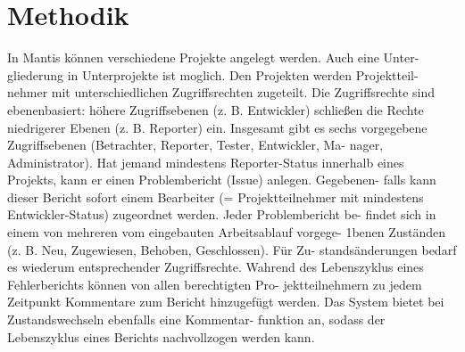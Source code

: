 \section{Methodik}
In Mantis können verschiedene Projekte angelegt werden. Auch eine Unter-
gliederung in Unterprojekte ist moglich. Den Projekten werden Projektteil-
nehmer mit unterschiedlichen Zugriffsrechten zugeteilt. Die Zugriffsrechte
sind ebenenbasiert: höhere Zugriffsebenen (z. B. Entwickler) schließen die
Rechte niedrigerer Ebenen (z. B. Reporter) ein. Insgesamt gibt es sechs
vorgegebene Zugriffsebenen (Betrachter, Reporter, Tester, Entwickler, Ma-
nager, Administrator). Hat jemand mindestens Reporter-Status innerhalb
eines Projekts, kann er einen Problembericht (Issue) anlegen. Gegebenen-
falls kann dieser Bericht sofort einem Bearbeiter (= Projektteilnehmer mit
mindestens Entwickler-Status) zugeordnet werden. Jeder Problembericht be-
findet sich in einem von mehreren vom eingebauten Arbeitsablauf vorgege-
1benen Zuständen (z. B. Neu, Zugewiesen, Behoben, Geschlossen). Für Zu-
standsänderungen bedarf es wiederum entsprechender Zugriffsrechte. Wahrend
des Lebenszyklus eines Fehlerberichts können von allen berechtigten Pro-
jektteilnehmern zu jedem Zeitpunkt Kommentare zum Bericht hinzugefügt
werden. Das System bietet bei Zustandswechseln ebenfalls eine Kommentar-
funktion an, sodass der Lebenszyklus eines Berichts nachvollzogen werden
kann.



